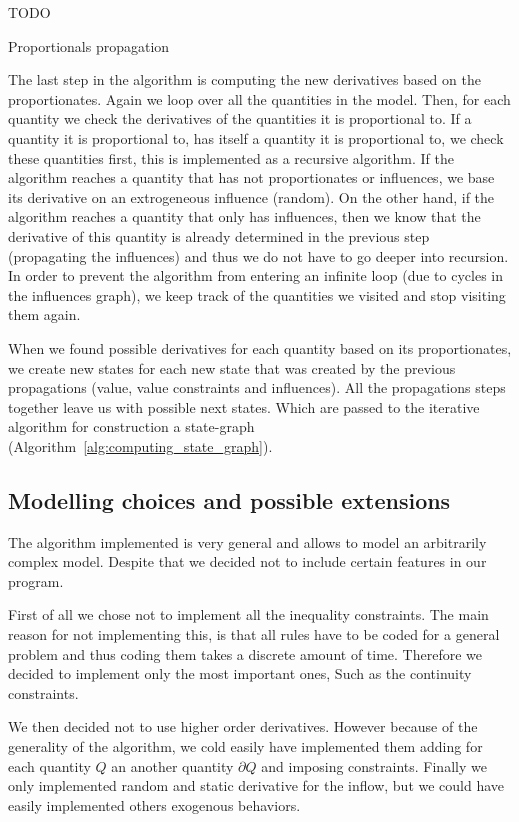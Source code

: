 \documentclass[a4paper]{article}
\begin{document}
\vspace{12pt}
\begin{algorithm}[H]
	TODO
	\caption{Proportionals propagation}
	\label{alg:propogating_proportionals}
\end{algorithm}
\vspace{12pt}

The last step in the algorithm is computing the new derivatives based on the proportionates. Again we loop over all the quantities in the model. Then, for each quantity we check the derivatives of the quantities it is proportional to. If a quantity it is proportional to, has itself a quantity it is proportional to, we check these quantities first, this is implemented as a recursive algorithm. If the algorithm reaches a quantity that has not proportionates or influences, we base its derivative on an extrogeneous influence (random). On the other hand, if the algorithm reaches a quantity that only has influences, then we know that the derivative of this quantity is already determined in the previous step (propagating the influences) and thus we do not have to go deeper into recursion. In order to prevent the algorithm from entering an infinite loop (due to cycles in the influences graph), we keep track of the quantities we visited and stop visiting them again.

When we found possible derivatives for each quantity based on its proportionates, we create new states for each new state that was created by the previous propagations (value, value constraints and influences). All the propagations steps together leave us with possible next states. Which are passed to the iterative algorithm for construction a state-graph (Algorithm~\ref{alg:computing_state_graph}).

\subsection{Modelling choices and possible extensions}
The algorithm implemented is very general and allows to model an arbitrarily complex model. Despite that we decided not to include certain features in our program.

First of all we chose not to implement all the inequality constraints. The main reason for not implementing this, is that all rules have to be coded for a general problem and thus coding them takes a discrete amount of time. Therefore we decided to implement only the most important ones, Such as the continuity constraints.

We then decided not to use higher order derivatives. However because of the generality of the algorithm, we cold easily have implemented them adding for each quantity $Q$ an another quantity $\partial Q$ and imposing constraints.
Finally we only implemented random and static derivative for the inflow, but we could have easily implemented others exogenous behaviors.
 
\end{document}
